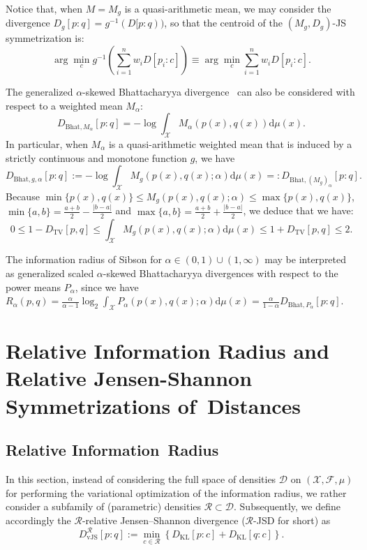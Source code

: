 \documentclass[entropy,article,accept,oneauthor,pdftex,entropy]{Definitions/mdpi}
\def\Bhat{\mathrm{Bhat}}
\def\TV{\mathrm{TV}}
\def\vJS{\mathrm{vJS}}
\def\KL{\mathrm{KL}}
\def\dmu{\mathrm{d}\mu}
\def\calF{\mathcal{F}}
\def\calD{\mathcal{D}}
\def\calR{\mathcal{R}}
\def\calX{\mathcal{X}}
\def\dmu{\mathrm{d}\mu}
\begin{document}
\begin{paracol}{2}
 



Notice that, when $M=M_g$ is a quasi-arithmetic mean, we may consider the divergence $D_g[p:q]=g^{-1}(D[p:q))$, so that the centroid of the
$(M_g,D_g)$-JS symmetrization is:
\begin{equation}
\arg\min_{c} g^{-1}\left( \sum_{i=1}^n w_i D[p_i:c] \right) \equiv \arg\min_{c}  \sum_{i=1}^n w_i D[p_i:c]. 
\end{equation}

The generalized $\alpha$-skewed Bhattacharyya divergence~\cite{GenBhat-2014} can also be considered with respect to a weighted mean $M_\alpha$:
$$
D_{\Bhat,M_\alpha}[p:q]=-\log\int_\calX M_\alpha(p(x),q(x)) \dmu(x).
$$
In particular, when $M_\alpha$ is a quasi-arithmetic weighted mean that is induced by a strictly continuous and monotone function $g$, we have
$$
D_{\Bhat,g,\alpha}[p:q]:=-\log\int_\calX M_g(p(x),q(x);\alpha) \dmu(x)=:D_{\Bhat,({M_g})_\alpha}[p:q].
$$
Because $\min\{p(x),q(x)\}\leq M_g(p(x),q(x);\alpha)\leq \max\{p(x),q(x)\}$, $\min\{a,b\}=\frac{a+b}{2}-\frac{|b-a|}{2}$ and $\max\{a,b\}=\frac{a+b}{2}+\frac{|b-a|}{2}$, we deduce that we have:
\begin{equation}
 0\leq  1-D_\TV[p,q] \leq \int_\calX M_g(p(x),q(x);\alpha) \dmu(x)\leq 1+D_\TV[p,q]\leq 2.
\end{equation}

The information radius of Sibson for $\alpha\in(0,1)\cup(1,\infty)$ may be interpreted as generalized scaled $\alpha$-skewed Bhattacharyya divergences with respect to the power means $P_\alpha$, since we have
$R_\alpha(p,q)=\frac{\alpha}{\alpha-1} \log_2 \int_\calX P_\alpha(p(x),q(x);\alpha) \dmu(x)=\frac{\alpha}{1-\alpha}D_{\Bhat,P_\alpha}[p:q]$.




\section{Relative Information Radius and Relative Jensen-Shannon Symmetrizations of~Distances}\label{sec:iref}

\subsection{Relative Information~Radius}\label{sec:relrad}

In this section, instead of considering the full space of densities $\calD$ on $(\calX,\calF,\mu)$ for performing the variational optimization of the information radius, 
we  rather consider a subfamily of (parametric) densities $\calR\subset\calD$.
Subsequently, we define accordingly the    $\calR$-relative Jensen--Shannon divergence ($\calR$-JSD for short) as
\begin{equation}
D_\vJS^\calR[p:q] := \min_{c\in\calR} \left\{D_\KL[p:c]+D_\KL[q:c]\right\}.
\end{equation}


\end{paracol}
\end{document}
